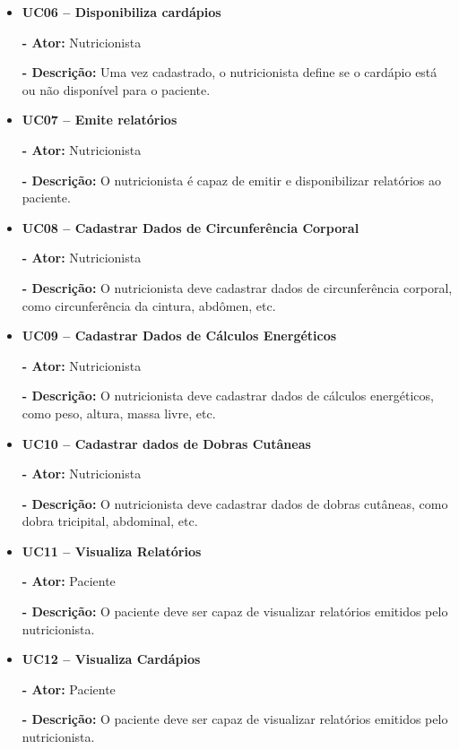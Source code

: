 \documentclass[
	12pt,				%
    oneside,			%
	a4paper,			%
	english,			%
	french,				%
	spanish,			%
	brazil,				%
	]{abntex2}
\begin{document}
\begin{itemize}
\item \textbf{UC06 – Disponibiliza cardápios}

\textbf{- Ator:} Nutricionista

\textbf{- Descrição:} Uma vez cadastrado, o nutricionista define se o
cardápio está ou não disponível para o paciente.

\item \textbf{UC07 – Emite relatórios}

\textbf{- Ator:} Nutricionista

\textbf{- Descrição:} O nutricionista é capaz de emitir e disponibilizar
relatórios ao paciente.

\item \textbf{UC08 – Cadastrar Dados de Circunferência Corporal}

\textbf{- Ator:} Nutricionista

\textbf{- Descrição:} O nutricionista deve cadastrar dados de
circunferência corporal, como circunferência da cintura, abdômen,
etc.

\item \textbf{UC09 – Cadastrar Dados de Cálculos Energéticos}

\textbf{- Ator:} Nutricionista

\textbf{- Descrição:} O nutricionista deve cadastrar dados de cálculos
energéticos, como peso, altura, massa livre, etc.

\item \textbf{UC10 – Cadastrar dados de Dobras Cutâneas}

\textbf{- Ator:} Nutricionista

\textbf{- Descrição:} O nutricionista deve cadastrar dados de dobras
cutâneas, como dobra tricipital, abdominal, etc.

\item \textbf{UC11 – Visualiza Relatórios}

\textbf{- Ator:} Paciente

\textbf{- Descrição:} O paciente deve ser capaz de visualizar relatórios
emitidos pelo nutricionista.

\item \textbf{UC12 – Visualiza Cardápios}

\textbf{- Ator:} Paciente

\textbf{- Descrição:} O paciente deve ser capaz de visualizar relatórios
emitidos pelo nutricionista.

\end{itemize}
\end{document}
